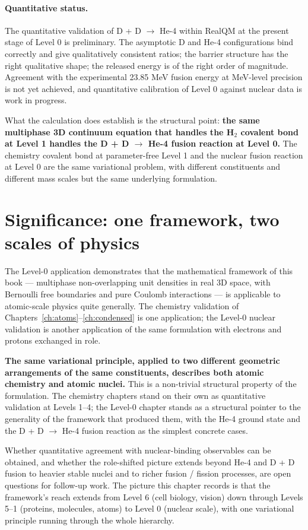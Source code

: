 \paragraph{Quantitative status.}
The quantitative validation of D + D $\to$ He-4 within RealQM at the present stage of Level 0 is preliminary. The asymptotic D and He-4 configurations bind correctly and give qualitatively consistent ratios; the barrier structure has the right qualitative shape; the released energy is of the right order of magnitude. Agreement with the experimental 23.85 MeV fusion energy at MeV-level precision is not yet achieved, and quantitative calibration of Level 0 against nuclear data is work in progress.

What the calculation does establish is the structural point: \textbf{the same multiphase 3D continuum equation that handles the H$_2$ covalent bond at Level 1 handles the D + D $\to$ He-4 fusion reaction at Level 0.} The chemistry covalent bond at parameter-free Level 1 and the nuclear fusion reaction at Level 0 are the same variational problem, with different constituents and different mass scales but the same underlying formulation.

\section{Significance: one framework, two scales of physics}\label{sec:nuc-natural-significance}

The Level-0 application demonstrates that the mathematical framework of this book --- multiphase non-overlapping unit densities in real 3D space, with Bernoulli free boundaries and pure Coulomb interactions --- is applicable to atomic-scale physics quite generally. The chemistry validation of Chapters~\ref{ch:atoms}--\ref{ch:condensed} is one application; the Level-0 nuclear validation is another application of the same formulation with electrons and protons exchanged in role.

\textbf{The same variational principle, applied to two different geometric arrangements of the same constituents, describes both atomic chemistry and atomic nuclei.} This is a non-trivial structural property of the formulation. The chemistry chapters stand on their own as quantitative validation at Levels 1--4; the Level-0 chapter stands as a structural pointer to the generality of the framework that produced them, with the He-4 ground state and the D + D $\to$ He-4 fusion reaction as the simplest concrete cases.

Whether quantitative agreement with nuclear-binding observables can be obtained, and whether the role-shifted picture extends beyond He-4 and D + D fusion to heavier stable nuclei and to richer fusion / fission processes, are open questions for follow-up work. The picture this chapter records is that the framework's reach extends from Level 6 (cell biology, vision) down through Levels 5--1 (proteins, molecules, atoms) to Level 0 (nuclear scale), with one variational principle running through the whole hierarchy.

